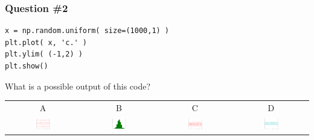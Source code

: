 \documentclass[11pt]{beamer}
\begin{document}
\begin{frame}[fragile]
  \frametitle{Question \#2}
  \Enlarge

  \begin{Verbatim}
x = np.random.uniform( size=(1000,1) )
plt.plot( x, 'c.' )
plt.ylim( (-1,2) )
plt.show()
  \end{Verbatim}

  What is a possible output of this code?

  \begin{center}
  \begin{tabular}{cccc}
    A & B & C & D \\
    \includegraphics[width=0.25\textwidth]{./img/figure_2.png}
    &
    \includegraphics[width=0.25\textwidth]{./img/figure_3.png}
    &
    \includegraphics[width=0.25\textwidth]{./img/figure_4.png}
    &
    \includegraphics[width=0.25\textwidth]{./img/figure_5.png}
  \end{tabular}
  \end{center}
\end{frame}
\end{document}
